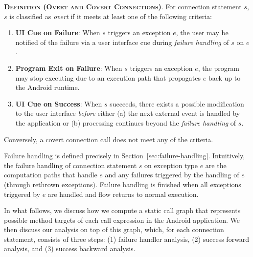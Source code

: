 \begin{description}[leftmargin=0cm,listparindent=0pt,itemindent=0cm]
\item \textsc{\bfseries{Definition (Overt and Covert
    Connections)}}.  For connection statement $s$, $s$ is classified as
   {\it overt} if it meets at least one of the following
  criteria:
  
\begin{enumerate}
\item  {\bf UI Cue on Failure}: When $s$ triggers an
  exception $e$,
  the user may be notified of the failure via a user interface cue
  during {\it failure handling} of $s$ on $e$.


\item {\bf Program Exit on Failure}: When $s$ triggers an exception $e$, the
program may stop executing due to an execution path that propagates
$e$ back up to the Android runtime.

\item {\bf UI Cue on Success}: When $s$ succeeds, there
  exists a possible modification to the user interface {\it before}
  either (a) the next external event is handled by the application or
  (b) processing continues beyond the {\it failure handling} of $s$.

\end{enumerate}

\noindent Conversely, a covert connection call does not meet any of
the criteria.  

\end{description}

Failure handling is defined precisely in
Section~\ref{sec:failure-handling}.  Intuitively, the failure handling
of connection statement $s$ on exception type $e$ are the computation
paths that handle $e$ and any failures triggered by the handling of
$e$ (through rethrown exceptions).  Failure handling is finished when
all exceptions triggered by $e$ are handled and flow returns to normal
execution.  

In what follows, we discuss how we compute a static call graph
that represents possible method targets of each call expression in the
Android application. We then discuss our analysis on top of this graph, 
which, for each connection statement, consists of three steps:
(1) failure handler analysis, (2) success forward analysis,
and (3) success backward analysis. 

